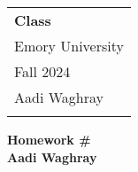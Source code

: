 \documentclass{article}
\begin{document}
\thispagestyle{empty}

\begin{tabular}{p{10.5cm}} 
	{\large \bf Class} \\
	Emory University\\ Fall 2024  \\ Aadi Waghray \\
	\bottomrule 
	\\
\end{tabular}

\vspace*{0.3cm}

\begin{center}
	{\Large \bf Homework \#}\\
	\vspace*{0.02cm}
	{\bf Aadi Waghray}
\end{center}

\vspace{0.4cm}
\end{document}
